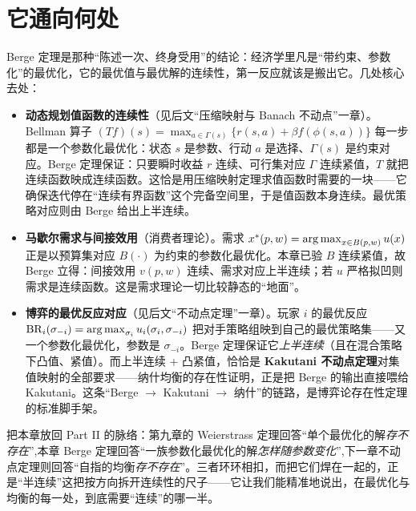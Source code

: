 
\section{它通向何处}
\label{sec:berge-beyond}

Berge 定理是那种``陈述一次、终身受用''的结论：经济学里凡是``带约束、参数化''的最优化，它的最优值与最优解的连续性，第一反应就该是搬出它。几处核心去处：

\begin{itemize}
    \item \textbf{动态规划值函数的连续性}（见后文``压缩映射与 Banach 不动点''一章）。Bellman 算子 $(Tf)(s)=\max_{a\in\Gamma(s)}\{r(s,a)+\beta f(\phi(s,a))\}$ 每一步都是一个参数化最优化：状态 $s$ 是参数、行动 $a$ 是选择、$\Gamma(s)$ 是约束对应。Berge 定理保证：只要瞬时收益 $r$ 连续、可行集对应 $\Gamma$ 连续紧值，$T$ 就把连续函数映成连续函数。这恰是用压缩映射定理求值函数时需要的一块——它确保迭代停在``连续有界函数''这个完备空间里，于是值函数本身连续。最优策略对应则由 Berge 给出上半连续。
    \item \textbf{马歇尔需求与间接效用}（消费者理论）。需求 $x^*(p,w)=\operatorname*{arg\,max}_{x\in B(p,w)}u(x)$ 正是以预算集对应 $B(\cdot)$ 为约束的参数化最优化。本章已验 $B$ 连续紧值，故 Berge 立得：间接效用 $v(p,w)$ 连续、需求对应上半连续；若 $u$ 严格拟凹则需求是连续函数。这是需求理论一切比较静态的``地面''。
    \item \textbf{博弈的最优反应对应}（见后文``不动点定理''一章）。玩家 $i$ 的最优反应 $\mathrm{BR}_i(\sigma_{-i})=\operatorname*{arg\,max}_{\sigma_i}u_i(\sigma_i,\sigma_{-i})$ 把对手策略组映到自己的最优策略集——又一个参数化最优化，参数是 $\sigma_{-i}$。Berge 定理保证它\emph{上半连续}（且在混合策略下凸值、紧值）。而上半连续 + 凸紧值，恰恰是 \textbf{Kakutani 不动点定理}对集值映射的全部要求——纳什均衡的存在性证明，正是把 Berge 的输出直接喂给 Kakutani。这条``Berge $\to$ Kakutani $\to$ 纳什''的链路，是博弈论存在性定理的标准脚手架。
\end{itemize}

把本章放回 Part II 的脉络：第九章的 Weierstrass 定理回答``单个最优化的解\emph{存不存在}'',本章 Berge 定理回答``一族参数化最优化的解\emph{怎样随参数变化}'',下一章不动点定理则回答``自指的均衡\emph{存不存在}''。三者环环相扣，而把它们焊在一起的，正是``半连续''这把按方向拆开连续性的尺子——它让我们能精准地说出，在最优化与均衡的每一处，到底需要``连续''的哪一半。

